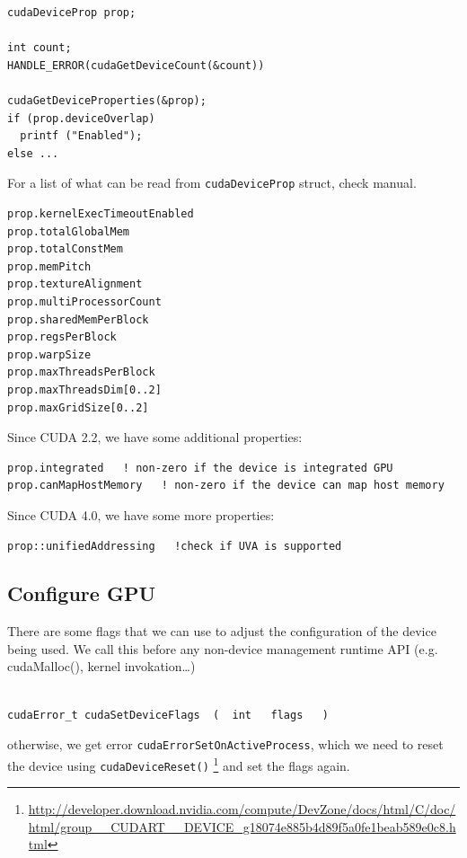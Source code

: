 \begin{lstlisting}
cudaDeviceProp prop;

int count;
HANDLE_ERROR(cudaGetDeviceCount(&count))

cudaGetDeviceProperties(&prop);
if (prop.deviceOverlap) 
  printf ("Enabled");
else ...
\end{lstlisting}
For a list of what can be read from \verb!cudaDeviceProp! struct, check manual.
\begin{lstlisting}
prop.kernelExecTimeoutEnabled
prop.totalGlobalMem
prop.totalConstMem
prop.memPitch
prop.textureAlignment
prop.multiProcessorCount
prop.sharedMemPerBlock
prop.regsPerBlock
prop.warpSize
prop.maxThreadsPerBlock
prop.maxThreadsDim[0..2]
prop.maxGridSize[0..2]
\end{lstlisting}

Since CUDA 2.2, we have some additional properties:
\begin{lstlisting}
prop.integrated   ! non-zero if the device is integrated GPU
prop.canMapHostMemory   ! non-zero if the device can map host memory
\end{lstlisting}

Since CUDA 4.0, we have some more properties:
\begin{lstlisting}
prop::unifiedAddressing   !check if UVA is supported
\end{lstlisting}


\subsection{Configure GPU}
\label{sec:configure_GPU}

There are some flags that we can use to adjust the configuration of the device
being used. We call this before any non-device management runtime API (e.g.
cudaMalloc(), kernel invokation\ldots)
\begin{verbatim}

cudaError_t cudaSetDeviceFlags  (  int   flags   )   

\end{verbatim}
otherwise, we get error \verb!cudaErrorSetOnActiveProcess!, which we need to
reset the device using
\verb!cudaDeviceReset()! 
\footnote{\url{http://developer.download.nvidia.com/compute/DevZone/docs/html/C/doc/html/group__CUDART__DEVICE_g18074e885b4d89f5a0fe1beab589e0c8.html}}
and set the flags again.

